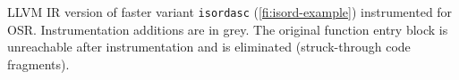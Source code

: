 \label{fig:isordascto} LLVM IR version of faster variant {\tt isordasc} (\myfigure\ref{fi:isord-example}) instrumented for OSR. Instrumentation additions are in grey. The original function entry block is unreachable after instrumentation and is eliminated (struck-through code fragments).